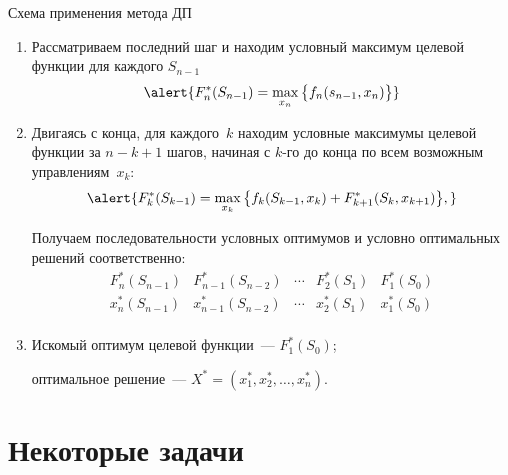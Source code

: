 \documentclass[unicode,11pt,notheorems,xcolor=table]{beamer}
\begin{document}
\begin{frame}{Схема применения метода ДП}{}


\begin{enumerate}
\item 
	Рассматриваем последний шаг и находим условный максимум целевой функции для каждого $S_{n-1}$
	$$
		\alert{F_n^*(S_{n-1})= \max_{x_n} \big\{f_n(s_{n-1},x_n) \big\} }
	$$
\item
	Двигаясь с конца, для каждого~$k$  находим условные максимумы целевой функции за  $n-k+1$  шагов, начиная с  $k$-го до конца по всем возможным управлениям~$x_k$:
	$$
		\alert{F_k^* (S_{k-1}) = \max_{x_k}  \big\{f_k(S_{k-1}, x_k) + F_{k+1}^*(S_k, x_{k+1}) \big\},}
$$


Получаем последовательности условных оптимумов и условно оптимальных решений соответственно:
$$
\begin{array}{ccccc}
F_n^*(S_{n-1}) & F_{n-1}^*(S_{n-2})& \cdots & F_2^*(S_1) & F_1^*(S_0)\\
x_n^*(S_{n-1}) & x_{n-1}^*(S_{n-2})& \cdots & x_2^*(S_1) & x_1^*(S_0)\\
\end{array}
$$

\item 
	Искомый оптимум целевой функции~--- \alert{$F_1^*(S_0)$};
	
	оптимальное решение~---  \alert{$X^*=(x_1^*, x_{2}^*, \ldots, x_{n}^*)$.}
\end{enumerate}

\end{frame}





\section{Некоторые задачи}
\end{document}
